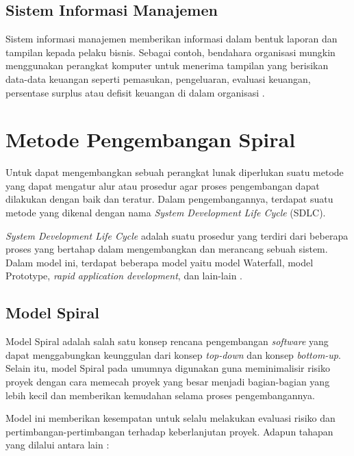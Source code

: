 	\subsection{Sistem Informasi Manajemen}
	Sistem informasi manajemen memberikan informasi dalam bentuk laporan dan tampilan kepada pelaku bisnis. Sebagai contoh, bendahara organisasi mungkin menggunakan perangkat komputer untuk menerima tampilan yang berisikan data-data keuangan seperti pemasukan, pengeluaran, evaluasi keuangan, persentase surplus atau defisit keuangan di dalam organisasi \cite{obrien}.


	
\section{Metode Pengembangan Spiral}
Untuk dapat mengembangkan sebuah perangkat lunak diperlukan suatu metode yang dapat mengatur alur atau prosedur agar proses pengembangan dapat dilakukan dengan baik dan teratur. Dalam pengembangannya, terdapat suatu metode yang dikenal dengan nama \emph{System Development Life Cycle} (SDLC).

\emph{System Development Life Cycle} adalah suatu prosedur yang terdiri dari beberapa proses yang bertahap dalam mengembangkan dan merancang sebuah sistem. Dalam model ini, terdapat beberapa model yaitu model Waterfall, model Prototype, \emph{rapid application development}, dan lain-lain \cite{amalina}.

\subsection{Model Spiral}
Model Spiral adalah salah satu konsep rencana pengembangan \emph{software} yang dapat menggabungkan keunggulan dari konsep \emph{top-down} dan konsep \emph{bottom-up}. Selain itu, model Spiral pada umumnya digunakan guna meminimalisir risiko proyek dengan cara memecah proyek yang besar menjadi bagian-bagian yang lebih kecil dan memberikan kemudahan selama proses pengembangannya.

Model ini memberikan kesempatan untuk selalu melakukan evaluasi risiko dan pertimbangan-pertimbangan terhadap keberlanjutan proyek. Adapun tahapan yang dilalui antara lain \cite{alshamrahi} :


